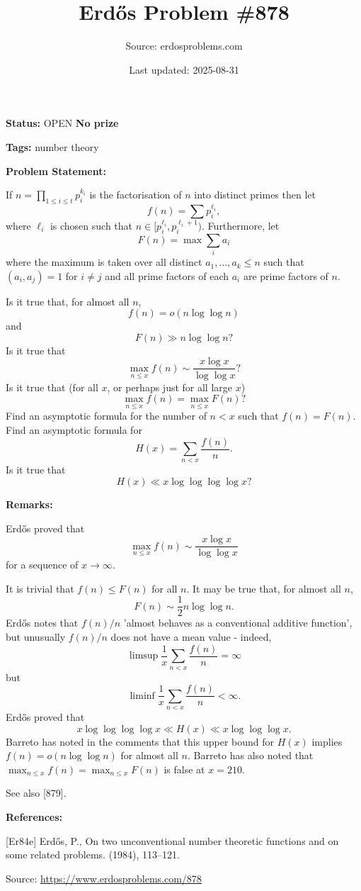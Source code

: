 \documentclass{article}
\title{Erd\H{o}s Problem \#878}
\date{Last updated: 2025-08-31}
\author{Source: erdosproblems.com}
\begin{document}
\maketitle

\noindent\textbf{Status:} OPEN \quad \textbf{No prize}

\noindent\textbf{Tags:} number theory

\medskip
\noindent\textbf{Problem Statement:}

If $n=\prod_{1\leq i\leq t} p_i^{k_i}$ is the factorisation of $n$ into distinct primes then let\[f(n)=\sum p_i^{\ell_i},\]where $\ell_i$ is chosen such that $n\in [p_i^{\ell_i},p_i^{\ell_i+1})$. Furthermore, let\[F(n)=\max \sum_{i} a_i\]where the maximum is taken over all distinct $a_1,\ldots,a_k\leq n$ such that $(a_i,a_j)=1$ for $i\neq j$ and all prime factors of each $a_i$ are prime factors of $n$.

Is it true that, for almost all $n$,\[f(n)=o(n\log\log n)\]and\[F(n) \gg n\log\log n?\]Is it true that\[\max_{n\leq x}f(n)\sim \frac{x\log x}{\log\log x}?\]Is it true that (for all $x$, or perhaps just for all large $x$)\[\max_{n\leq x}f(n)=\max_{n\leq x}F(n)?\]Find an asymptotic formula for the number of $n<x$ such that $f(n)=F(n)$. Find an asymptotic formula for\[H(x)=\sum_{n<x}\frac{f(n)}{n}.\]Is it true that\[H(x) \ll x\log\log\log\log x?\]

\bigskip
\noindent\textbf{Remarks:}

Erd\H{o}s \cite{Er84e} proved that\[\max_{n\leq x}f(n)\sim \frac{x\log x}{\log\log x}\]for a sequence of $x\to \infty$.

It is trivial that $f(n)\leq F(n)$ for all $n$. It may be true that, for almost all $n$,\[F(n)\sim \frac{1}{2}n\log\log n.\]Erd\H{o}s notes that $f(n)/n$ 'almost behaves as a conventional additive function', but unusually $f(n)/n$ does not have a mean value - indeed,\[\limsup \frac{1}{x}\sum_{n<x}\frac{f(n)}{n}=\infty\]but\[\liminf \frac{1}{x}\sum_{n<x}\frac{f(n)}{n}<\infty.\]Erd\H{o}s \cite{Er84e} proved that\[x\log\log\log\log x\ll H(x) \ll x\log\log\log x.\]Barreto has noted in the comments that this upper bound for $H(x)$ implies $f(n)=o(n\log\log n)$ for almost all $n$. Barreto has also noted that $\max_{n\leq x}f(n)=\max_{n\leq x}F(n)$ is false at $x=210$.

See also [879].

\bigskip
\noindent\textbf{References:}

[Er84e] Erd\H{o}s, P., On two unconventional number theoretic functions and on some
related problems. (1984), 113--121.

\bigskip
\noindent\small{Source: \url{https://www.erdosproblems.com/878}}
\end{document}
